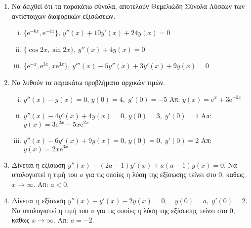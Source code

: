 


\pagestyle{askhseis}
\everymath{\displaystyle}





\begin{center}
\end{center}

\vspace{\baselineskip}

\begin{enumerate}
  \item Να δειχθεί ότι τα  παρακάτω σύνολα, αποτελούν Θεμελιώδη Σύνολα Λύσεων των 
    αντίστοιχων διαφορικών εξισώσεων.
    \begin{enumerate}[i)]
      \item $ \{ \mathrm{e}^{-6x}, \mathrm{e}^{-4x} \} $,\quad 
        $ y''(x)+10y'(x)+24y(x)=0 $ 
      \item $ \{ \cos{2x}, \sin{2x} \}$, \quad $ y''(x)+4y(x)=0 $
      \item $ \{ \mathrm{e}^{-x}, \mathrm{e}^{3x}, x\mathrm{e}^{3x} \} $, 
        \quad $ y'''(x)-5y''(x)+3y'(x)+9y(x)=0 $
    \end{enumerate}

  \item Να λυθούν τα παρακάτω προβλήματα αρχικών τιμών.
    \begin{enumerate}[i)]
      \item $ y''(x) - y(x)=0 $, \quad $ y(0)=4, \; y'(0)=-5 $ 
        \hfill Απ:  $ y(x)= \mathrm{e}^{x}+3 \mathrm{e}^{-2x} $ 
      \item $ y''(x)-4y'(x)+4y(x)=0 $, \quad $ y(0)=3, \; y'(0)=1 $ 
        \hfill Απ:  $ y(x)=3 \mathrm{e}^{2x} - 5x \mathrm{e}^{2x} $
      \item $ y''(x)-6y'(x)+9y(x)=0 $, \quad $ y(0)=0, \; y'(0)=2 $ 
        \hfill Απ:  $ y(x)=2x \mathrm{e}^{3x} $
    \end{enumerate}

  \item Δίνεται η εξίσωση $ y''(x)-(2a-1)y'(x)+a(a-1)y(x)=0 $. Να υπολογιστεί 
    η τιμή του $a$ για τις οποίες η λύση της εξίσωσης τείνει στο 0, καθως 
    $ x \to \infty $.
    \hfill Απ: $ a<0 $. 

  \item Δίνεται η εξίσωση $ y''(x)-y'(x)-2y(x)=0, \quad y(0)=a, \; y'(0)=2 $. 
    Να υπολογιστεί η τιμή του $a$ για τις οποίες η λύση της εξίσωσης τείνει στο 0, 
    καθως $ x \to \infty $.
    \hfill Απ: $ a=-2 $. 


\end{enumerate}
